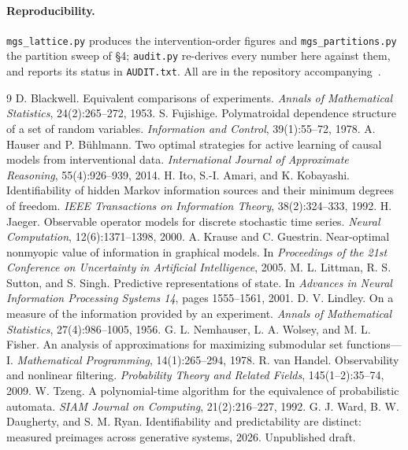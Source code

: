 \documentclass[11pt]{article}
\begin{document}
\paragraph{Reproducibility.}
\texttt{mgs\_lattice.py} produces the intervention-order figures and
\texttt{mgs\_partitions.py} the partition sweep of \S4; \texttt{audit.py} re-derives every
number here against them, and reports its status in \texttt{AUDIT.txt}. All are in the
repository accompanying~\cite{paper1}.

\begin{thebibliography}{9}
 D. Blackwell. Equivalent comparisons of experiments.
\emph{Annals of Mathematical Statistics}, 24(2):265--272, 1953.
 S. Fujishige. Polymatroidal dependence structure of a set of
random variables. \emph{Information and Control}, 39(1):55--72, 1978.
 A. Hauser and P. B\"uhlmann. Two optimal strategies for active
learning of causal models from interventional data. \emph{International Journal of
Approximate Reasoning}, 55(4):926--939, 2014.
 H. Ito, S.-I. Amari, and K. Kobayashi. Identifiability of hidden Markov
information sources and their minimum degrees of freedom. \emph{IEEE Transactions on
Information Theory}, 38(2):324--333, 1992.
 H. Jaeger. Observable operator models for discrete stochastic time
series. \emph{Neural Computation}, 12(6):1371--1398, 2000.
 A. Krause and C. Guestrin. Near-optimal nonmyopic value of
information in graphical models. In \emph{Proceedings of the 21st Conference on
Uncertainty in Artificial Intelligence}, 2005.
 M. L. Littman, R. S. Sutton, and S. Singh. Predictive
representations of state. In \emph{Advances in Neural Information Processing Systems 14},
pages 1555--1561, 2001.
 D. V. Lindley. On a measure of the information provided by an
experiment. \emph{Annals of Mathematical Statistics}, 27(4):986--1005, 1956.
 G. L. Nemhauser, L. A. Wolsey, and M. L. Fisher. An analysis of
approximations for maximizing submodular set functions---I. \emph{Mathematical
Programming}, 14(1):265--294, 1978.
 R. van Handel. Observability and nonlinear filtering.
\emph{Probability Theory and Related Fields}, 145(1--2):35--74, 2009.
 W. Tzeng. A polynomial-time algorithm for the equivalence of
probabilistic automata. \emph{SIAM Journal on Computing}, 21(2):216--227, 1992.
 G. J. Ward, B. W. Daugherty, and S. M. Ryan. Identifiability and
predictability are distinct: measured preimages across generative systems, 2026.
Unpublished draft.
\end{thebibliography}
\end{document}
